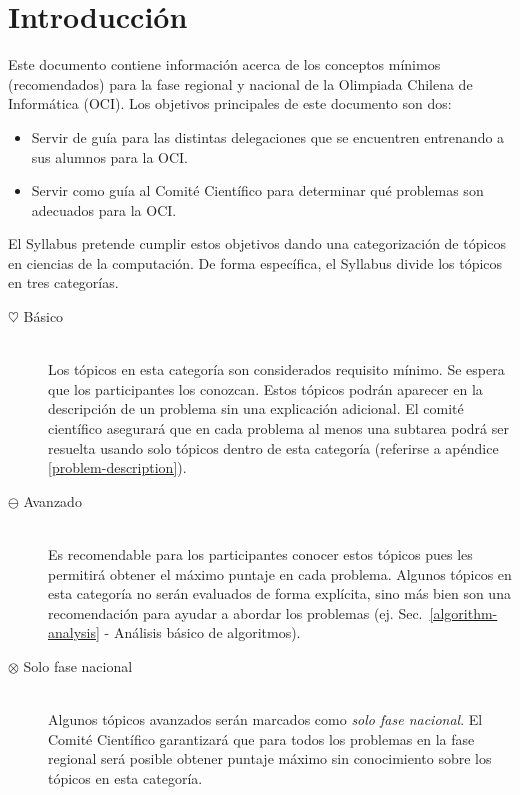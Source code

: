 \documentclass{article}
\newcommand{\basic}{$\heartsuit$}
\newcommand{\advanced}{$\ominus$}
\newcommand{\ultra}{$\otimes$}
\begin{document}
\section{Introducción}\label{sec:intro}
Este documento contiene información acerca de los conceptos mínimos (recomendados)
para la fase regional y nacional de la Olimpiada Chilena de Informática (OCI).
Los objetivos principales de este documento son dos:
\begin{itemize}
  \item Servir de guía para las distintas delegaciones que se encuentren
    entrenando a sus alumnos para la OCI.
  \item Servir como guía al Comité Científico para determinar qué problemas son
    adecuados para la OCI.
\end{itemize}
El Syllabus pretende cumplir estos objetivos dando una categorización de tópicos
en ciencias de la computación.
De forma específica, el Syllabus divide los tópicos en tres categorías.
\begin{description}
\item[\basic{} Básico]
  \hspace{1em} \\
  Los tópicos en esta categoría son considerados requisito mínimo.
    Se espera que los participantes los conozcan.
    Estos tópicos podrán aparecer en la descripción de un problema sin una
    explicación adicional.
    El comité científico asegurará que en cada problema al menos una subtarea podrá
    ser resuelta usando solo tópicos dentro de esta categoría (referirse a
    apéndice \ref{problem-description}).
  \item[\advanced{} Avanzado]
    \hspace{1em} \\
    Es recomendable para los participantes conocer estos tópicos pues les
    permitirá obtener el máximo puntaje en cada problema.
    Algunos tópicos en esta categoría no serán evaluados de forma explícita,
    sino más bien son una recomendación para ayudar a abordar los problemas (ej.
    Sec.~\ref{algorithm-analysis} - Análisis básico de algoritmos).
  \item[\ultra{} Solo fase nacional]
    \hspace{1em} \\
    Algunos tópicos avanzados serán marcados como \textit{solo fase nacional}.
    El Comité Científico garantizará que para todos los problemas en la fase
    regional será posible obtener puntaje máximo sin conocimiento sobre los
    tópicos en esta categoría.
\end{description}
\end{document}
